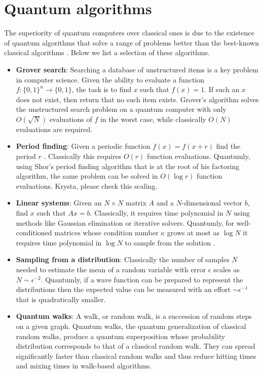 \documentclass[journal]{IEEEtran}
\begin{document}
\section{Quantum algorithms}
\label{sec:box2}
The superiority of quantum computers over classical ones is due to the existence of quantum algorithms that solve a range of problems  better than the best-known classical algorithms \cite{jordan2011quantum}. Below we list a selection of these algorithms.

\begin{itemize}
\item {\bf Grover search}:
Searching a database of unstructured items is a key problem in computer science.  Given the ability to evaluate a function $f: \{0,1\}^n\rightarrow \{0,1\}$, the task is to find $x$ such that $f(x)=1$.  If such an $x$ does not exist, then return that no such item exists.   
Grover's algorithm solves the unstructured search problem on a quantum computer with only $O(\sqrt{N})$ evaluations of $f$ in the worst case, while classically $O(N)$ evaluations are required.  

\item {\bf Period finding}: Given a periodic function $f(x)=f(x+r)$ find the period $r$ . Classically this requires $O(r)$ function evaluations. Quantumly, using Shor's period finding algorithm that is at the root of his factoring algorithm, the same problem can be solved in $O(\log r)$ function evaluations. {\color{red} Krysta, please check this scaling.}


\item {\bf Linear systems}: Given an $N\times N$ matrix $A$ and a $N$-dimensional vector $b$, find $x$ such that $Ax=b$.
Classically, it requires time polynomial in $N$ using methods like Gaussian elimination or iterative solvers. Quantumly, for well-conditioned matrices whose condition number $\kappa$ grows at most as $\log N$ it requires time polynomial in $\log N$ to sample from the solution \cite{}. 



\item  {\bf  Sampling from a distribution}: Classically the number of samples $N$ needed to estimate the mean of a random variable with error $\epsilon$  scales as $N\sim \epsilon^{-2}$. Quantumly, if a wave function can be prepared to represent the distributions then the expected value can be measured with an effort  $\sim\epsilon^{-1}$ that is quadratically smaller.

\item       {\bf Quantum walks}:
A walk, or random walk, is a succession of random steps on a given graph. Quantum walks, the quantum generalization of classical random walks, produce a quantum superposition whose probability distribution corresponds to that of a classical random walk. They can spread significantly faster than classical random walks and thus reduce hitting times and mixing times in walk-based algorithms.



\end{itemize}
\end{document}
